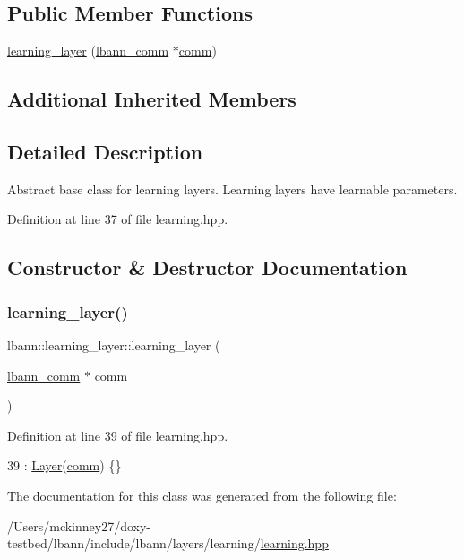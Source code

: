 \subsection*{Public Member Functions}
\begin{DoxyCompactItemize}
\item 
\hyperlink{classlbann_1_1learning__layer_a818a96b1d3daabb22b1e82c1c54c6268}{learning\+\_\+layer} (\hyperlink{classlbann_1_1lbann__comm}{lbann\+\_\+comm} $\ast$\hyperlink{file__io_8cpp_ab048c6f9fcbcfaa57ce68b00263dbebe}{comm})
\end{DoxyCompactItemize}
\subsection*{Additional Inherited Members}


\subsection{Detailed Description}
Abstract base class for learning layers. Learning layers have learnable parameters. 

Definition at line 37 of file learning.\+hpp.



\subsection{Constructor \& Destructor Documentation}
\mbox{\label{classlbann_1_1learning__layer_a818a96b1d3daabb22b1e82c1c54c6268}} 
\subsubsection{\texorpdfstring{learning\+\_\+layer()}{learning\_layer()}}
{\footnotesize\ttfamily lbann\+::learning\+\_\+layer\+::learning\+\_\+layer (\begin{DoxyParamCaption}\item[{\hyperlink{classlbann_1_1lbann__comm}{lbann\+\_\+comm} $\ast$}]{comm }\end{DoxyParamCaption})\hspace{0.3cm}{\ttfamily [inline]}}



Definition at line 39 of file learning.\+hpp.


\begin{DoxyCode}
39 : \hyperlink{classlbann_1_1Layer_a24e9c82354a0a2af1b70cbca2211e7d4}{Layer}(\hyperlink{file__io_8cpp_ab048c6f9fcbcfaa57ce68b00263dbebe}{comm}) \{\}
\end{DoxyCode}


The documentation for this class was generated from the following file\+:\begin{DoxyCompactItemize}
\item 
/\+Users/mckinney27/doxy-\/testbed/lbann/include/lbann/layers/learning/\hyperlink{learning_8hpp}{learning.\+hpp}\end{DoxyCompactItemize}
